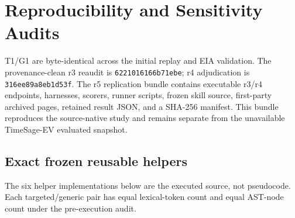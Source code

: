 \section{Reproducibility and Sensitivity Audits}
T1/G1 are byte-identical across the initial replay and EIA validation. The provenance-clean r3 reaudit is \texttt{6221016166b71ebe}; r4 adjudication is \texttt{316ee89a8eb1d53f}. The r5 replication bundle contains executable r3/r4 endpoints, harnesses, scorers, runner scripts, frozen skill source, first-party archived pages, retained result JSON, and a SHA-256 manifest. This bundle reproduces the source-native study and remains separate from the unavailable TimeSage-EV evaluated snapshot.

\subsection{Exact frozen reusable helpers}
The six helper implementations below are the executed source, not pseudocode. Each targeted/generic pair has equal lexical-token count and equal AST-node count under the pre-execution audit.

